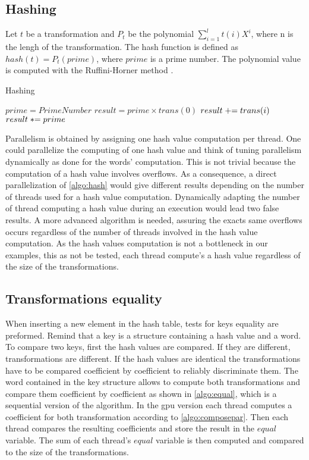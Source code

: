 {\subsection{Hashing}
\label{part:hash}
Let $t$ be a transformation and $P_{t}$ be the polynomial $\displaystyle\sum_{i=1}^{l} t(i)X^i$, where n is the lengh of the transformation. The hash function is defined as $hash(t) = P_{t}(prime)$, where $prime$ is a prime number.
The polynomial value is computed with the Ruffini-Horner method \cite{borwein2012polynomials}.
\begin{algorithm}
\caption{Hashing}
\label{algo:hash}
\begin{algorithmic}
\STATE $prime = PrimeNumber$
\STATE $result = prime \times trans(0)$
\STATE $\switch result += trans(i)$
\STATE $\switch result *= prime$
\ENDFOR
\end{algorithmic}
\end{algorithm}
Parallelism is obtained by assigning one hash value computation per thread.
One could parallelize the computing of one hash value and think of tuning parallelism dynamically as done for the words' computation. 
This is not trivial because the computation of a hash value involves overflows. 
As a consequence, a direct parallelization of \autoref{algo:hash} would give different results depending on the number of threads used for a hash value computation. 
Dynamically adapting the number of thread computing a hash value during an execution would lead two false results. 
A more advanced algorithm is needed, assuring the exacts same overflows occurs regardless of the number of threads involved in the hash value computation. 
As the hash values computation is not a bottleneck in our examples, this as not be tested, each thread compute's a hash value regardless of the size of the transformations.


\subsection{Transformations equality}
\label{part:equality}
When inserting a new element in the hash table, tests for keys equality are preformed.
Remind that a key is a structure containing a hash value and a word.
To compare two keys, first the hash values are compared. If they are different, transformations are different.
If the hash values are identical the transformations have to be compared coefficient by coefficient to reliably discriminate them. 
The word contained in the key structure allows to compute both transformations and compare them coefficient by coefficient as shown in \autoref{algo:equal}, which is a sequential version of the algorithm.
In the \gls{gpu} version each thread computes a coefficient for both transformation according to \autoref{algo:composepar}. 
Then each thread compares the resulting coefficients and store the result in the $equal$ variable. 
The sum of each thread's $equal$ variable is then computed and compared to the size of the transformations.

}

